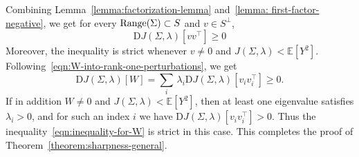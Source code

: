 \documentclass[sn-mathphys-num]{sn-jnl}%
\numberwithin{equation}{section}
\newcommand{\E}{\mathbb{E}}
\newcommand{\Range}{{\rm Range}}
\theoremstyle{thmstyleone}%
\theoremstyle{thmstyletwo}%
\theoremstyle{thmstylethree}%
\begin{document}
Combining Lemma~\ref{lemma:factorization-lemma} and~\ref{lemma: first-factor-negative}, we get
for every $\Range(\Sigma)\subset S$ and $v\in S^\perp$, 
\begin{equation}
\label{eqn:strict-complementary-slackness-condition}
	\mathrm{D} J(\Sigma, \lambda)[vv^\top] \ge 0
\end{equation} 
Moreover, the inequality is strict whenever $v \neq 0$ and $J(\Sigma, \lambda) < \E[Y^2]$. Following~\eqref{eqn:W-into-rank-one-perturbations}, 
we get 
\begin{equation}
\label{eqn:inequality-for-W}
	  \mathrm{D} J(\Sigma,\lambda)[W]
  = \sum_i \,\lambda_i \mathrm{D} J(\Sigma,\lambda)[v_i v_i^\top] \ge 0.
\end{equation}
If in addition $W \neq 0$ and $J(\Sigma, \lambda) < \E[Y^2]$, then at least one eigenvalue satisfies $\lambda_i > 0$, 
and for such an index $i$ we have $\mathrm{D} J(\Sigma,\lambda)[v_i v_i^\top] > 0$. 
Thus the inequality~\eqref{eqn:inequality-for-W} is strict in this case.  
This completes the proof of Theorem~\ref{theorem:sharpness-general}.


\end{document}
